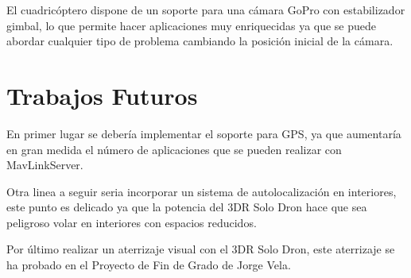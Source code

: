 El cuadricóptero dispone de un soporte para una cámara GoPro con estabilizador gimbal, lo que permite hacer aplicaciones muy enriquecidas ya que se puede abordar cualquier tipo de problema cambiando la posición inicial de la cámara.

\section{Trabajos Futuros}

En primer lugar se debería implementar el soporte para GPS, ya que aumentaría en gran medida el número de aplicaciones que se pueden realizar con MavLinkServer. 

Otra linea a seguir seria incorporar un sistema de autolocalización en interiores, este punto es delicado ya que la potencia del 3DR Solo Dron hace que sea peligroso volar en interiores con espacios reducidos.

Por último realizar un aterrizaje visual con el 3DR Solo Dron, este aterrizaje se ha probado en el Proyecto de Fin de Grado de Jorge Vela\cite{jorgeVelaTFG}.


